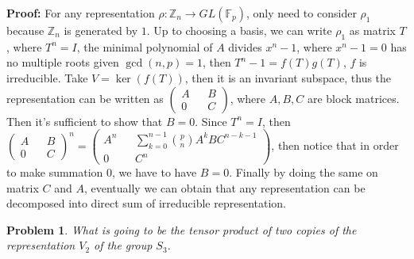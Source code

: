 \documentclass[12pt]{article}
\newtheorem{problem}{Problem}
\begin{document}
\textbf{Proof:} For any representation $\rho: \mathbb{Z}_n\to GL(\mathbb{F}_p)$, only need to consider $\rho_1$ because $\mathbb{Z}_n$ is generated by $1$. Up to choosing a basis, we can write $\rho_1$ as matrix $T$, where $T^n=I$, the minimal polynomial of $A$ divides $x^n-1$, where $x^n-1=0$ has no multiple roots given $\gcd(n,p)=1$, then $T^n-1=f(T)g(T)$, $f$ is irreducible. Take $V=\ker (f(T))$, then it is an invariant subspace, thus the representation can be written as $\begin{pmatrix}
    A && B \\
    0 && C
\end{pmatrix}$, where $A,B,C$ are block matrices. Then it's sufficient to show that $B=0$. Since $T^n=I$, then $\begin{pmatrix}
    A && B \\
    0 && C
\end{pmatrix}^n=\begin{pmatrix}
    A^n && \sum_{k=0}^{n-1}{p \choose n} A^kBC^{n-k-1} \\
    0 && C^n
\end{pmatrix}$, then notice that in order to make summation $0$, we have to have $B=0$. Finally by doing the same on matrix $C$ and $A$, eventually we can obtain that any representation can be decomposed into direct sum of irreducible representation.
\\
\begin{problem}
What is going to be the tensor product of two copies of the representation $V_2$ of the group $S_3$.
\end{problem}
\end{document}
